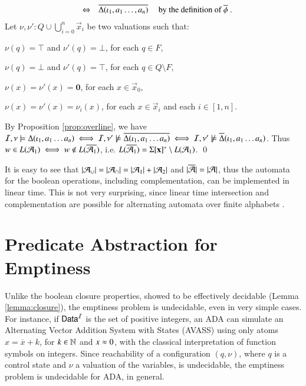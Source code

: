 \documentclass{llncs}
\begin{document}
{\[\begin{array}{rcll}
  & \Leftrightarrow & \overline{\Delta(\iota_1,a_1\ldots,a_n)} & \text{ by the definition of $\overline{\phi}$ .}
  \end{array}\]
  Let $\nu,\nu' : Q \cup \bigcup_{i=0}^n\vec{x}_i$ be two valuations
  such that: \begin{compactitem}
  \item $\nu(q) = \top$ and $\nu'(q) = \bot$, for each $q \in F$, 
  \item $\nu(q) = \bot$ and $\nu'(q) = \top$, for each $q \in Q \setminus F$, 
  \item $\nu(x) = \nu'(x) = \mathbf{0}$, for each $x \in \vec{x}_0$, 
  \item $\nu(x) = \nu'(x) = \nu_i(x)$, for each $x \in \vec{x}_i$ and each $i
    \in [1,n]$.
  \end{compactitem}
  By Proposition \ref{prop:overline}, we have $\mathcal{I},\nu \models
  \Delta(\iota_1,a_1 \ldots a_n) \iff \mathcal{I},\nu' \not\models
  \overline{\Delta(\iota_1,a_1 \ldots a_n)} \iff \mathcal{I},\nu' \not\models
  \overline{\Delta}(\iota_1,a_1 \ldots a_n)$. Thus $w \in L(\mathcal{A}_1) \iff
  w \not\in L(\overline{\mathcal{A}_1})$, i.e. $L(\overline{\mathcal{A}_1}) =
  \Sigma[\mathbf x]^* \setminus L(\mathcal{A}_1)$. \qed}

It is easy to see that ${|{\mathcal{A}_\cup}|} = {|{\mathcal{A}_\cap}|} = {|{\mathcal{A}_1}|} +
{|{\mathcal{A}_2}|}$ and ${|{\overline{\mathcal{A}}}|} = {|{\mathcal{A}}|}$, thus the automata
for the boolean operations, including complementation, can be
implemented in linear time. This is not very surprising, since linear
time intersection and complementation are possible for alternating
automata over finite alphabets \cite{ChandraKozenStockmeyer81}.

\section{Predicate Abstraction for Emptiness}

Unlike the boolean closure properties, showed to be effectively
decidable (Lemma \ref{lemma:closure}), the emptiness problem is
undecidable, even in very simple cases. For instance, if $\mathsf{Data}^{\mathcal{I}}$ is
the set of positive integers, an ADA can simulate an Alternating
Vector Addition System with States (AVASS) \cite{LazicSchmitz14} using
only atoms $x = \overline{x} + k$, for $k \in {\bf \mathbb{N}}$ and $x \approx 0$,
with the classical interpretation of function symbols on
integers. Since reachability of a configuration $(q,\nu)$, where $q$
is a control state and $\nu$ a valuation of the variables, is
undecidable, the emptiness problem is undecidable for ADA, in general. 
\end{document}
